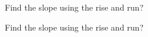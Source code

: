 \documentclass[12pt, a4paper, addpoints]{exam}
\begin{document}
\begin{questions}



\newcommand{\smallspace}{\vspace{1mm}}


\question Find the slope using the rise and run?
\begin{multicols}{3}
\end{multicols}




\renewcommand{\smallspace}{\vspace{4mm}}
\question Find the slope using the rise and run?
\begin{multicols}{3}
\end{multicols}
\end{questions}
\end{document}
